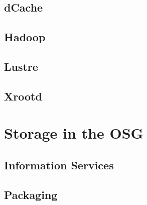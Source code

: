 \documentclass{beamer}
\begin{document}
\subsection{dCache}

\subsection{Hadoop}
\subsection{Lustre}
\subsection{Xrootd}

\section{Storage in the OSG}
\subsection{Information Services}
\subsection{Packaging}
\end{document}
